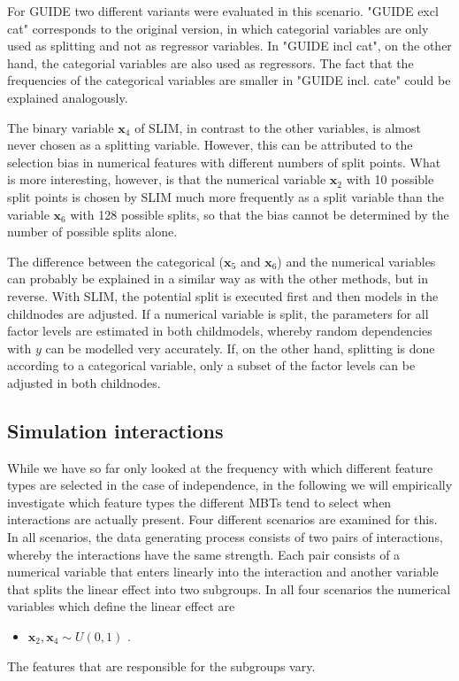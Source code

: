 For GUIDE two different variants were evaluated in this scenario. "GUIDE excl cat" corresponds to the original version, in which categorial variables are only used as splitting and not as regressor variables. In "GUIDE incl cat", on the other hand, the categorial variables are also used as regressors. The fact that the frequencies of the categorical variables are smaller in "GUIDE incl. cate" could be explained analogously.

The binary variable $\textbf{x}_4$ of SLIM, in contrast to the other variables, is almost never chosen as a splitting variable. However, this can be attributed to the selection bias in numerical features with different numbers of split points. What is more interesting, however, is that the numerical variable $\textbf{x}_2$ with 10 possible split points is chosen by SLIM much more frequently as a split variable than the variable $\textbf{x}_6$ with 128 possible splits, so that the bias cannot be determined by the number of possible splits alone.

The difference between the categorical ($\textbf{x}_5$ and $\textbf{x}_6$) and the numerical variables can probably be explained in a similar way as with the other methods, but in reverse. With SLIM, the potential split is executed first and then models in the childnodes are adjusted.  If a numerical variable is split, the parameters for all factor levels are estimated in both childmodels, whereby random dependencies with $y$ can be modelled very accurately. If, on the other hand, splitting is done according to a categorical variable, only a subset of the factor levels can be adjusted in both childnodes.





\subsection{Simulation interactions}
While we have so far only looked at the frequency with which different feature types are selected in the case of independence, in the following we will empirically investigate which feature types the different MBTs tend to select when interactions are actually present.
Four different scenarios are examined for this. In all scenarios, the data generating process consists of two pairs of interactions, whereby the interactions have the same strength. Each pair consists of a numerical variable that enters linearly into the interaction and another variable that splits the linear effect into two subgroups.
In all four scenarios the numerical variables which define the linear effect are 
\begin{itemize}
    \item $\textbf{x}_{2}, \textbf{x}_{4} \sim U(0,1)$ .
\end{itemize}
The features that are responsible for the subgroups vary.

